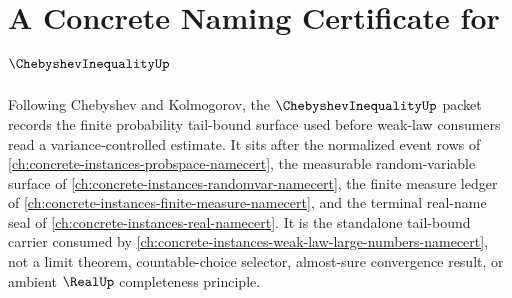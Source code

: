 \chapter{A Concrete Naming Certificate for $\ChebyshevInequalityUp$}
\label{ch:concrete-instances-chebyshev-inequality-namecert}

Following Chebyshev and Kolmogorov, the $\ChebyshevInequalityUp$ packet records the finite probability tail-bound surface used before weak-law consumers read a variance-controlled estimate. It sits after the normalized event rows of \autoref{ch:concrete-instances-probspace-namecert}, the measurable random-variable surface of \autoref{ch:concrete-instances-randomvar-namecert}, the finite measure ledger of \autoref{ch:concrete-instances-finite-measure-namecert}, and the terminal real-name seal of \autoref{ch:concrete-instances-real-namecert}. It is the standalone tail-bound carrier consumed by \autoref{ch:concrete-instances-weak-law-large-numbers-namecert}, not a limit theorem, countable-choice selector, almost-sure convergence result, or ambient $\RealUp$ completeness principle.


